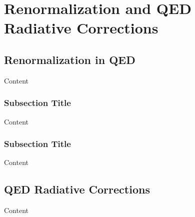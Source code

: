 
\chapter{Renormalization and QED Radiative Corrections} %

\label{ch:Renorm} %


\section{Renormalization in QED}

Content


\subsection{Subsection Title}

Content


\subsection{Subsection Title}

Content


\section{QED Radiative Corrections}

Content
